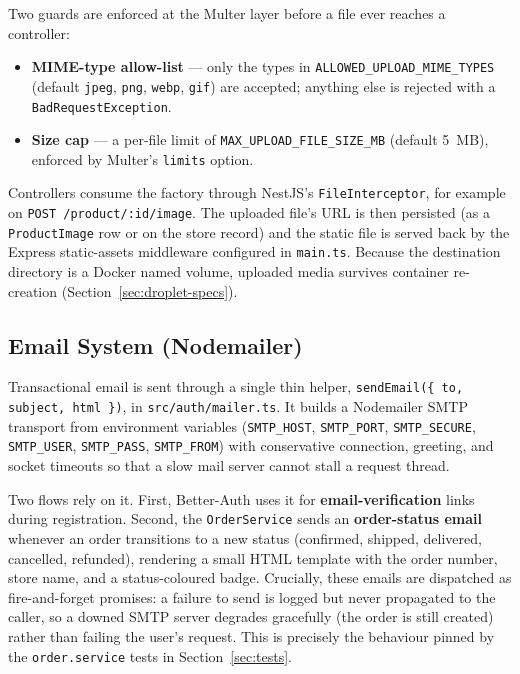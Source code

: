 \documentclass[12pt, a4paper, oneside]{report}
\begin{document}
Two guards are enforced at the Multer layer before a file ever
reaches a controller:

\begin{itemize}[leftmargin=*,itemsep=2pt]
  \item \textbf{MIME-type allow-list} --- only the types in
        \texttt{ALLOWED\_UPLOAD\_MIME\_TYPES} (default
        \texttt{jpeg}, \texttt{png}, \texttt{webp}, \texttt{gif})
        are accepted; anything else is rejected with a
        \texttt{BadRequestException}.
  \item \textbf{Size cap} --- a per-file limit of
        \texttt{MAX\_UPLOAD\_FILE\_SIZE\_MB} (default 5~MB),
        enforced by Multer's \texttt{limits} option.
\end{itemize}

Controllers consume the factory through NestJS's
\texttt{FileInterceptor}, for example on
\texttt{POST /product/:id/image}. The uploaded file's URL is then
persisted (as a \texttt{ProductImage} row or on the store record) and
the static file is served back by the Express static-assets
middleware configured in \texttt{main.ts}. Because the destination
directory is a Docker named volume, uploaded media survives container
re-creation (Section~\ref{sec:droplet-specs}).

\subsection{Email System (Nodemailer)}

Transactional email is sent through a single thin helper,
\texttt{sendEmail(\{ to, subject, html \})}, in
\texttt{src/auth/mailer.ts}. It builds a Nodemailer SMTP transport
from environment variables (\texttt{SMTP\_HOST},
\texttt{SMTP\_PORT}, \texttt{SMTP\_SECURE}, \texttt{SMTP\_USER},
\texttt{SMTP\_PASS}, \texttt{SMTP\_FROM}) with conservative
connection, greeting, and socket timeouts so that a slow mail server
cannot stall a request thread.

Two flows rely on it. First, Better-Auth uses it for
\textbf{email-verification} links during registration. Second, the
\texttt{OrderService} sends an \textbf{order-status email} whenever an
order transitions to a new status (confirmed, shipped, delivered,
cancelled, refunded), rendering a small HTML template with the order
number, store name, and a status-coloured badge. Crucially, these
emails are dispatched as fire-and-forget promises: a failure to send
is logged but never propagated to the caller, so a downed SMTP server
degrades gracefully (the order is still created) rather than failing
the user's request. This is precisely the behaviour pinned by the
\texttt{order.service} tests in Section~\ref{sec:tests}.
\end{document}
